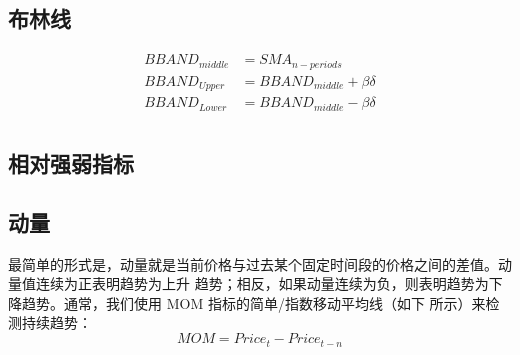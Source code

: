 \subsection{布林线}
\begin{equation}
    \begin{aligned}
        BBAND_{middle} & =SMA_{n-periods}            \\
        BBAND_{Upper}  & =BBAND_{middle}+\beta\delta \\
        BBAND_{Lower}  & =BBAND_{middle}-\beta\delta \\
    \end{aligned}
\end{equation}
\subsection{相对强弱指标}
\subsection{动量}
最简单的形式是，动量就是当前价格与过去某个固定时间段的价格之间的差值。动量值连续为正表明趋势为上升
趋势；相反，如果动量连续为负，则表明趋势为下降趋势。通常，我们使用 MOM 指标的简单/指数移动平均线（如下
所示）来检测持续趋势：
\begin{equation}
    MOM=Price_t-Price_{t-n}
\end{equation}